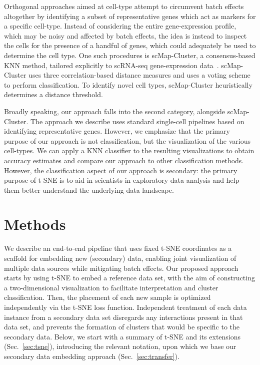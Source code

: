 \documentclass[runningheads]{llncs}
\begin{document}
Orthogonal approaches aimed at cell-type attempt to circumvent batch effects
altogether by identifying a subset of representative genes which act as markers
for a specific cell-type. Instead of considering the entire gene-expression
profile, which may be noisy and affected by batch effects, the idea is instead
to inspect the cells for the presence of a handful of genes, which could
adequately be used to determine the cell type. One such procedures is
scMap-Cluster, a consensus-based KNN method, tailored explicitly to scRNA-seq
gene-expression data~\cite{Kiselev2018}. scMap-Cluster uses three
correlation-based distance measures and uses a voting scheme to perform
classification. To identify novel cell types, scMap-Cluster heuristically
determines a distance threshold.

Broadly speaking, our approach falls into the second category, alongside
scMap-Cluster. The approach we describe uses standard single-cell pipelines
based on identifying representative genes. However, we emphasize that the
primary purpose of our approach is not classification, but the visualization of
the various cell-types. We can apply a KNN classifier to the resulting
visualizations to obtain accuracy estimates and compare our approach to other
classification methods. However, the classification aspect of our approach is
secondary: the primary purpose of t-SNE is to aid in scientists in exploratory
data analysis and help them better understand the underlying data landscape.


\section{Methods}

We describe an end-to-end pipeline that uses fixed t-SNE coordinates as a
scaffold for embedding new (secondary) data, enabling joint visualization of
multiple data sources while mitigating batch effects. Our proposed approach
starts by using t\nobreakdash -SNE to embed a reference data set, with the aim
of constructing a two-dimensional visualization to facilitate interpretation
and cluster classification. Then, the placement of each new sample is optimized
independently via the t\nobreakdash -SNE loss function. Independent treatment
of each data instance from a secondary data set disregards any interactions
present in that data set, and prevents the formation of clusters that would be
specific to the secondary data. Below, we start with a summary of t-SNE and its
extensions (Sec.~\ref{sec:tsne}), introducing the relevant notation, upon which
we base our secondary data embedding approach (Sec.~\ref{sec:transfer}).
\end{document}
